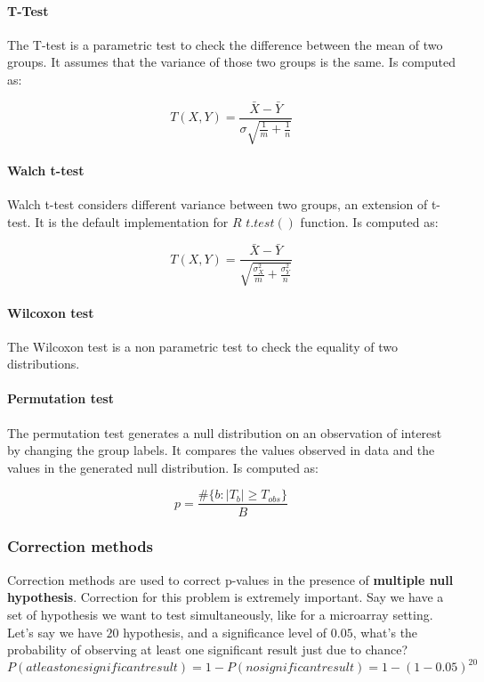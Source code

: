 			\paragraph{T-Test}
			
			The T-test is a parametric test to check the difference between the mean of two groups.
			It assumes that the variance of those two groups is the same.
			Is computed as:

			$$T(X, Y) = \frac{\bar{X}-\bar{Y}}{\sigma\sqrt{\frac{1}{m}+\frac{1}{n}}}$$

			\paragraph{Walch t-test}
			Walch t-test considers different variance between two groups, an extension of t-test.
			It is the default implementation for $R$ $t.test()$ function.
			Is computed as:

			$$T(X, Y) = \frac{\bar{X}-\bar{Y}}{\sqrt{\frac{\sigma^2_{X}}{m}+\frac{\sigma^2_Y}{n}}}$$

			\paragraph{Wilcoxon test}
			The Wilcoxon test is a non parametric test to check the equality of two distributions.

			\paragraph{Permutation test}
			The permutation test generates a null distribution on an observation of interest by changing the group labels.
			It compares the values observed in data and the values in the generated null distribution.
			Is computed as:

			$$p = \frac{\#\{b:|T_b|\ge T_{obs}\}}{B}$$

			

		\subsubsection{Correction methods}
		Correction methods are used to correct p-values in the presence of \textbf{multiple null hypothesis}.
		Correction for this problem is extremely important.
		Say we have a set of hypothesis we want to test simultaneously, like for a microarray setting.
		Let's say we have $20$ hypothesis, and a significance level of $0.05$, what's the probability of observing at least one significant result just due to chance?
		$$P(at least one significant result) = 1- P(no significant result) = 1-(1-0.05)^{20}$$
		
